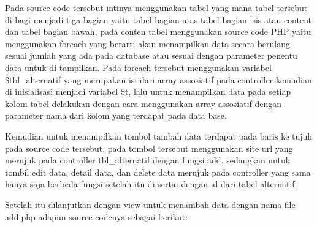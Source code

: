 Pada source code tersebut intinya menggunakan tabel yang mana tabel tersebut di bagi menjadi tiga bagian yaitu tabel bagian atas tabel bagian isis atau content dan tabel bagian bawah, pada conten tabel menggunakan source code PHP yaitu menggunakan foreach yang berarti akan menampilkan data secara berulang sesuai jumlah yang ada pada database atau sesuai dengan parameter penentu data untuk di tampilkan. Pada foreach tersebut menggunakan variabel \$tbl\_alternatif yang merupakan isi dari array assosiatif pada controller kemudian di inisialisasi menjadi variabel \$t, lalu untuk menampilkan data pada setiap kolom tabel delakukan dengan cara menggunakan array assosiatif dengan parameter nama dari kolom yang terdapat pada data base.\par
Kemudian untuk menampilkan tombol tambah data terdapat pada baris ke tujuh pada source code tersebut, pada tombol tersebut menggunakan site url yang merujuk pada controller tbl\_alternatif dengan fungsi add, sedangkan untuk tombil edit data, detail data, dan delete data merujuk pada controller yang sama hanya saja berbeda fungsi setelah itu di sertai dengan id dari tabel alternatif.\par
Setelah itu dilanjutkan dengan view untuk menambah data dengan nama file add.php adapun source codenya sebagai berikut:\par


